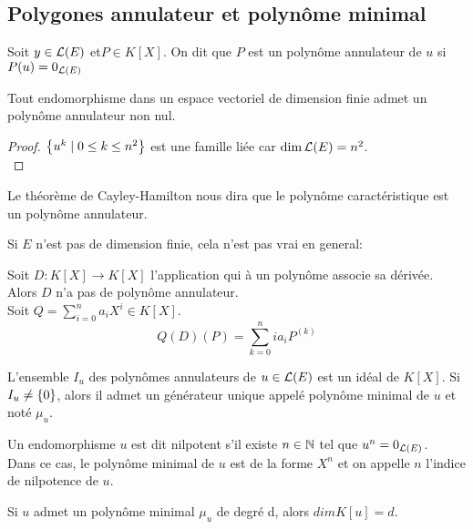 \subsection{Polygones annulateur et polynôme minimal}


\begin{definition}
	Soit $y \in \mathcal{L}(E)$ et$P \in K[X]$. On dit que $P$ est un polynôme annulateur de $u$ si $P(u) = 0_{\mathcal{L}(E)}$
\end{definition}


\begin{prop}
	Tout endomorphisme dans un espace vectoriel de dimension finie admet un polynôme annulateur non nul.
\end{prop}


\begin{proof}
	$\left\{u^k \mid 0 \leq k \leq n^2\right\}$ est une famille liée car $\dim \mathcal{L}(E) = n^2$.\\
\end{proof}


\begin{remarque}
	Le théorème de Cayley-Hamilton nous dira que le polynôme caractéristique est un polynôme annulateur.
\end{remarque}

\begin{remarque}
	Si $E$ n'est pas de dimension finie, cela n'est pas vrai en general:

	Soit $ D : K[X] \to K[X]$ l'application qui à un polynôme associe sa dérivée. Alors $D$ n'a pas de polynôme annulateur.\\
	Soit $Q = \sum\limits_{i=0}^n a_iX^i \in K[X]$.
	$$Q(D)(P) = \sum\limits_{k=0}^n ia_i P^{(k)}$$
\end{remarque}



\begin{prop}
	L'ensemble $I_u$ des polynômes annulateurs de $u \in \mathcal{L}(E)$ est un idéal de $K[X]$.
	Si $I_u \neq \left\{0\right\}$, alors il admet un générateur unique appelé polynôme minimal de $u$ et noté $\mu_u$.
\end{prop}


\begin{definition}
	Un endomorphisme $u$ est dit nilpotent s'il existe $n \in \mathbb{N}$ tel que $u^n = 0_{\mathcal{L}(E)}$.\\
	Dans ce cas, le polynôme minimal de $u$ est de la forme $X^n$ et on appelle $n$ l'indice de nilpotence de $u$.
\end{definition}


\begin{remarque}
    Si $u$ admet un polynôme minimal $\mu_u$ de degré d, alors $dim K[u] = d$.
\end{remarque}

